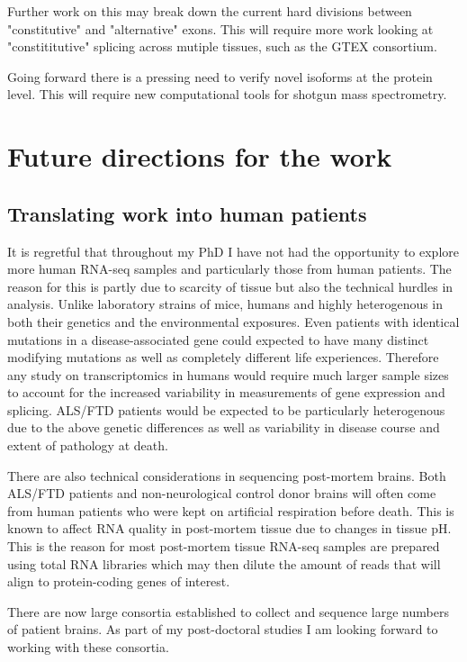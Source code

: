 Further work on this may break down the current hard divisions between "constitutive" and "alternative" exons. This will require more work looking at "constititutive" splicing across mutiple tissues, such as the GTEX consortium. 



Going forward there is a pressing need to verify novel isoforms at the protein level. This will require new computational tools for shotgun mass spectrometry.
	
	
\section{Future directions for the work}

\subsection{Translating work into human patients}

It is regretful that throughout my PhD I have not had the opportunity to explore more human RNA-seq samples and particularly those from human patients.
The reason for this is partly due to scarcity of tissue but also the technical hurdles in analysis.
Unlike laboratory strains of mice, humans and highly heterogenous in both their genetics and the environmental exposures.
Even patients with identical mutations in a disease-associated gene could  expected to have many distinct modifying mutations as well as completely different life experiences.
Therefore any study on transcriptomics in humans would require much larger sample sizes to account for the increased variability in measurements of gene expression and splicing.
ALS/FTD patients would be expected to be particularly heterogenous due to the above genetic differences as well as variability in disease course and extent of pathology at death.

There are also technical considerations in sequencing post-mortem brains.
Both ALS/FTD patients and non-neurological control donor brains will often come from human patients who were kept on artificial respiration before death. 
This is known to affect RNA quality in post-mortem tissue due to changes in tissue pH.
This is the reason for most post-mortem tissue RNA-seq samples are prepared using total RNA libraries which may then dilute the amount of reads that will align to protein-coding genes of interest.

There are now large consortia established to collect and sequence large numbers of patient brains. 
As part of my post-doctoral studies I am looking forward to working with these consortia.

